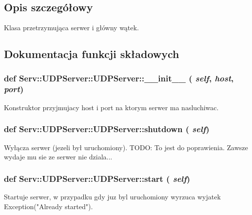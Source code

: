\subsection{Opis szczegółowy}
\begin{DoxyVerb}Klasa przetrzymująca serwer i główny wątek.\end{DoxyVerb}
 

\subsection{Dokumentacja funkcji składowych}
\hypertarget{class_serv_1_1_u_d_p_server_1_1_u_d_p_server_a08fcc38fca5727c085acc11c9df7f512}{
\subsubsection[{\_\-\_\-init\_\-\_\-}]{\setlength{\rightskip}{0pt plus 5cm}def Serv::UDPServer::UDPServer::\_\-\_\-init\_\-\_\- ( {\em self}, \/   {\em host}, \/   {\em port})}}
\label{class_serv_1_1_u_d_p_server_1_1_u_d_p_server_a08fcc38fca5727c085acc11c9df7f512}
\begin{DoxyVerb}Konstruktor przyjmujacy host i port na ktorym serwer ma nasluchiwac.\end{DoxyVerb}
 \hypertarget{class_serv_1_1_u_d_p_server_1_1_u_d_p_server_a43b3b2016322a79953939e56653d226d}{
\subsubsection[{shutdown}]{\setlength{\rightskip}{0pt plus 5cm}def Serv::UDPServer::UDPServer::shutdown ( {\em self})}}
\label{class_serv_1_1_u_d_p_server_1_1_u_d_p_server_a43b3b2016322a79953939e56653d226d}
\begin{DoxyVerb}Wyłącza serwer (jezeli był uruchomiony).
TODO: To jest do poprawienia. Zawsze wydaje mu sie ze serwer nie dziala...
\end{DoxyVerb}
 \hypertarget{class_serv_1_1_u_d_p_server_1_1_u_d_p_server_a9feda8e8dfee13803aa3fd07ddd003a1}{
\subsubsection[{start}]{\setlength{\rightskip}{0pt plus 5cm}def Serv::UDPServer::UDPServer::start ( {\em self})}}
\label{class_serv_1_1_u_d_p_server_1_1_u_d_p_server_a9feda8e8dfee13803aa3fd07ddd003a1}
\begin{DoxyVerb}Startuje serwer, w przypadku gdy juz byl uruchomiony wyrzuca wyjatek Exception("Already started").\end{DoxyVerb}
 

